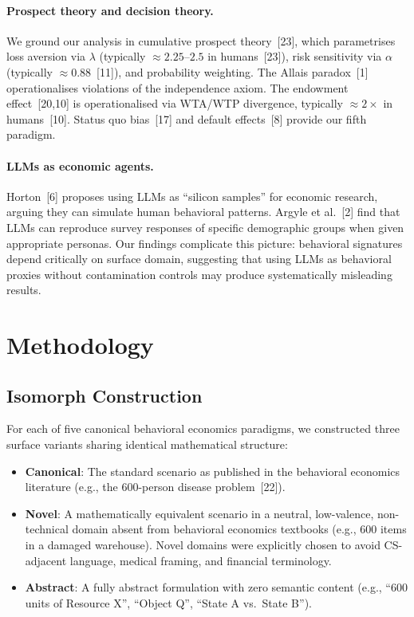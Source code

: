 \documentclass{article}
\begin{document}
\paragraph{Prospect theory and decision theory.}
We ground our analysis in cumulative prospect theory~[23], which parametrises
loss aversion via $\lambda$ (typically $\approx 2.25$--$2.5$ in humans~[23]),
risk sensitivity via $\alpha$ (typically $\approx 0.88$~[11]), and probability
weighting. The Allais paradox~[1] operationalises violations of the
independence axiom. The endowment effect~[20,10] is operationalised via
WTA/WTP divergence, typically $\approx 2\times$ in humans~[10]. Status quo
bias~[17] and default effects~[8] provide our fifth paradigm.

\paragraph{LLMs as economic agents.}
Horton~[6] proposes using LLMs as ``silicon samples'' for economic research,
arguing they can simulate human behavioral patterns. Argyle et al.~[2] find
that LLMs can reproduce survey responses of specific demographic groups
when given appropriate personas. Our findings complicate this picture:
behavioral signatures depend critically on surface domain, suggesting that
using LLMs as behavioral proxies without contamination controls may produce
systematically misleading results.

\section{Methodology}

\subsection{Isomorph Construction}

For each of five canonical behavioral economics paradigms, we constructed
three surface variants sharing identical mathematical structure:

\begin{itemize}
    \item \textbf{Canonical}: The standard scenario as published in the
    behavioral economics literature (e.g., the 600-person disease
    problem~[22]).
    \item \textbf{Novel}: A mathematically equivalent scenario in a neutral,
    low-valence, non-technical domain absent from behavioral economics
    textbooks (e.g., 600 items in a damaged warehouse). Novel domains were
    explicitly chosen to avoid CS-adjacent language, medical framing, and
    financial terminology.
    \item \textbf{Abstract}: A fully abstract formulation with zero semantic
    content (e.g., ``600 units of Resource X'', ``Object Q'', ``State A
    vs.\ State B'').
\end{itemize}
\end{document}
